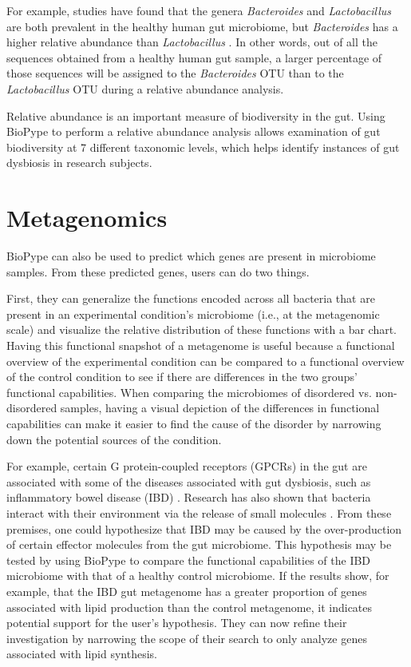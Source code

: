 {For example, studies have found that the genera \textit{Bacteroides} and \textit{Lactobacillus} are both prevalent in the healthy human gut microbiome, but \textit{Bacteroides} has a higher relative abundance than \textit{Lactobacillus} \cite{Lloyd-Price2016}. In other words, out of all the sequences obtained from a healthy human gut sample, a larger percentage of those sequences will be assigned to the \textit{Bacteroides} OTU than to the \textit{Lactobacillus} OTU during a relative abundance analysis. 

Relative abundance is an important measure of biodiversity in the gut. Using BioPype to perform a relative abundance analysis allows examination of gut biodiversity at 7 different taxonomic levels, which helps identify instances of gut dysbiosis in research subjects. 

\section{Metagenomics}

BioPype can also be used to predict which genes are present in microbiome samples. From these predicted genes, users can do two things. 

First, they can generalize the functions encoded across all bacteria that are present in an experimental condition's microbiome (i.e., at the metagenomic scale) and visualize the relative distribution of these functions with a bar chart. Having this functional snapshot of a metagenome is useful because a functional overview of the experimental condition can be compared to a functional overview of the control condition to see if there are differences in the two groups' functional capabilities. When comparing the microbiomes of disordered vs. non-disordered samples, having a visual depiction of the differences in functional capabilities can make it easier to find the cause of the disorder by narrowing down the potential sources of the condition. 

For example, certain G protein-coupled receptors (GPCRs) in the gut are associated with some of the diseases associated with gut dysbiosis, such as inflammatory bowel disease (IBD) \citep{Cohen2017}. Research has also shown that bacteria interact with their environment via the release of small molecules \citep{Li2012}. From these premises, one could hypothesize that IBD may be caused by the over-production of certain effector molecules from the gut microbiome. This hypothesis may be tested by using BioPype to compare the functional capabilities of the IBD microbiome with that of a healthy control microbiome. If the results show, for example, that the IBD gut metagenome has a greater proportion of genes associated with lipid production than the control metagenome, it indicates potential support for the user's hypothesis. They can now refine their investigation by narrowing the scope of their search to only analyze genes associated with lipid synthesis.

}
